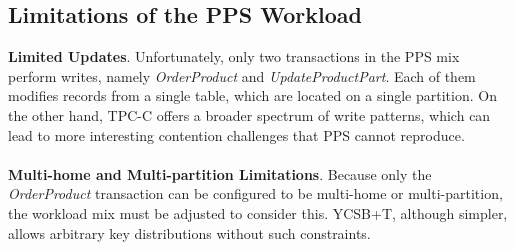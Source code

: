 \subsection{Limitations of the PPS Workload}
\label{subsec: limitations-of-the-pps-workload}
\textbf{Limited Updates}. Unfortunately, only two transactions in the PPS mix perform writes, namely \textit{OrderProduct} and \textit{UpdateProductPart}. Each of them modifies records from a single table, which are located on a single partition. On the other hand, TPC-C offers a broader spectrum of write patterns, which can lead to more interesting contention challenges that PPS cannot reproduce.\\\\
\textbf{Multi-home and Multi-partition Limitations}. Because only the \textit{OrderProduct} transaction can be configured to be multi-home or multi-partition, the workload mix must be adjusted to consider this. YCSB+T, although simpler, allows arbitrary key distributions without such constraints.